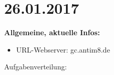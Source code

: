 \documentclass[11pt,a4paper]{scrbook}
\begin{document}
\section*{26.01.2017}
\textbf{Allgemeine, aktuelle Infos:}
\begin{itemize}
\item URL-Webserver: gc.antim8.de
\end{itemize}
Aufgabenverteilung:
\end{document}
